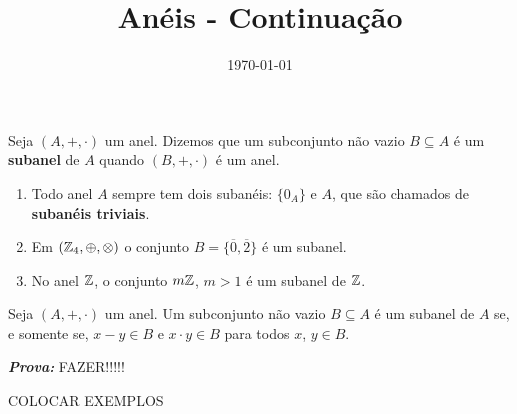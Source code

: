 \documentclass{beamer}
\title{Anéis - Continuação}
\author[\autor]{\autor}
\institute[\instituto]{\instituto}
\date{\today}
\begin{document}
    \begin{frame}
        \maketitle
    \end{frame}

    
    \begin{frame}
        \begin{definicao}
            Seja $(A, +, \cdot)$ um anel. Dizemos que um subconjunto n{\~a}o vazio $B\subseteq A$ {\'e} um \textbf{subanel} de $A$ quando $(B, +, \cdot)$ \'e um anel.
        \end{definicao}

        \begin{exemplos}
            \begin{enumerate}[label={\arabic*})]
                \item Todo anel $A$ sempre tem dois suban{\'e}is: $\{0_{A}\}$ e $A$, que s{\~a}o chamados de \textbf{suban{\'e}is triviais}.

                \vspace{.5cm}

                \item Em $(\mathbb{Z}_4,\oplus,\otimes)$ o conjunto $B = \{\overline{0}, \overline{2}\}$ \'e um subanel.

                \vspace{.5cm}
                
                \item No anel $\mathbb{Z}$, o conjunto $m\mathbb{Z}$, $m > 1$ {\'e} um subanel de $\mathbb{Z}$.

                \vspace{.5cm}
            \end{enumerate} 
        \end{exemplos}
    \end{frame}

    \begin{frame}
        \begin{proposicao}
            Seja $(A, +,\cdot)$ um anel. Um subconjunto n{\~a}o vazio $B\subseteq A$ {\'e} um subanel de $A$ se, e somente se, $x - y \in B$ e $x\cdot y \in B$ para todos $x$, $y \in B$.
        \end{proposicao}

        \noindent \textbf{\textit{Prova: }}FAZER!!!!!

        \begin{exemplos}
            COLOCAR EXEMPLOS
        \end{exemplos}
    \end{frame}
    
\end{document}
